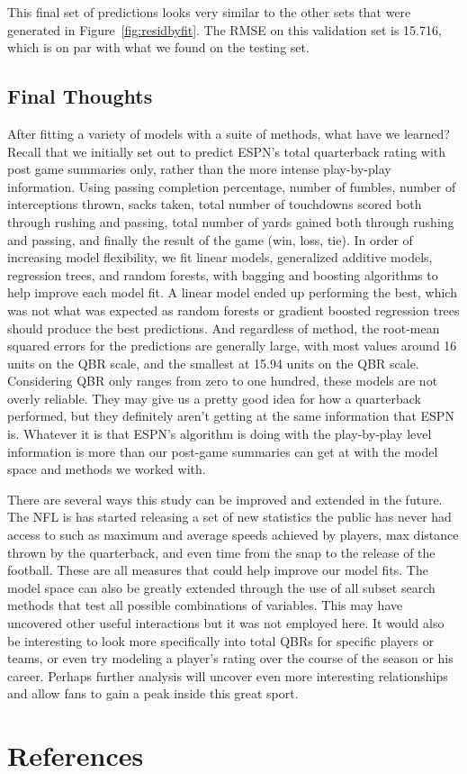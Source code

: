 \documentclass[12pt]{article}\usepackage[]{graphicx}\usepackage[]{color}
\begin{document}
\noindent
This final set of predictions looks very similar to the other sets that were generated in Figure~\ref{fig:residbyfit}. The RMSE on this validation set is 15.716, which is on par with what we found on the testing set.

\subsection{Final Thoughts}
After fitting a variety of models with a suite of methods, what have we learned? Recall that we initially set out to predict ESPN's total quarterback rating with post game summaries only, rather than the more intense play-by-play information. Using passing completion percentage, number of fumbles, number of interceptions thrown, sacks taken, total number of touchdowns scored both through rushing and passing, total number of yards gained both through rushing and passing, and finally the result of the game (win, loss, tie). In order of increasing model flexibility, we fit linear models, generalized additive models, regression trees, and random forests, with bagging and boosting algorithms to help improve each model fit. A linear model ended up performing the best, which was not what was expected as random forests or gradient boosted regression trees should produce the best predictions. And regardless of method, the root-mean squared errors for the predictions are generally large, with most values around 16 units on the QBR scale, and the smallest at 15.94 units on the QBR scale. Considering QBR only ranges from zero to one hundred, these models are not overly reliable. They may give us a pretty good idea for how a quarterback performed, but they definitely aren't getting at the same information that ESPN is. Whatever it is that ESPN's algorithm is doing with the play-by-play level information is more than our post-game summaries can get at with the model space and methods we worked with. 

There are several ways this study can be improved and extended in the future. The NFL is has started releasing a set of new statistics the public has never had access to such as maximum and average speeds achieved by players, max distance thrown by the quarterback, and even time from the snap to the release of the football. These are all measures that could help improve our model fits. The model space can also be greatly extended through the use of all subset search methods that test all possible combinations of variables. This may have uncovered other useful interactions but it was not employed here. It would also be interesting to look more specifically into total QBRs for specific players or teams, or even try modeling a player's rating over the course of the season or his career. Perhaps further analysis will uncover even more interesting relationships and allow fans to gain a peak inside this great sport.

\nocite{*}

\newpage
\section{References}
\begin{flushleft}


\end{flushleft}
\end{document}
